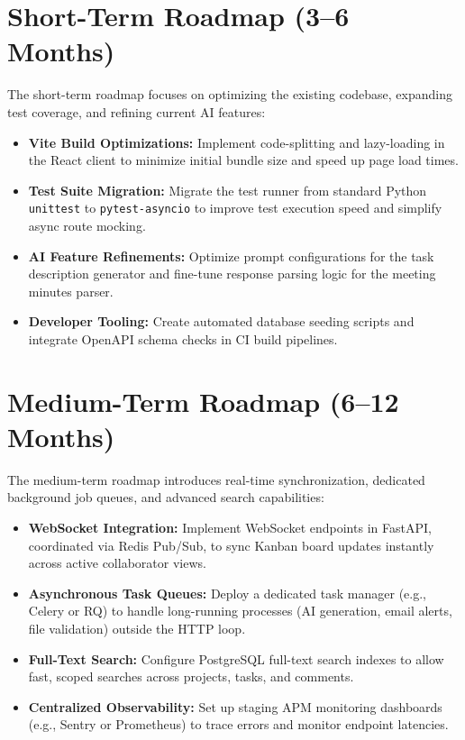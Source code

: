 \section{Short-Term Roadmap (3--6 Months)}
The short-term roadmap focuses on optimizing the existing codebase, expanding test coverage, and refining current AI features:
\begin{itemize}
    \item \textbf{Vite Build Optimizations:} Implement code-splitting and lazy-loading in the React client to minimize initial bundle size and speed up page load times.
    \item \textbf{Test Suite Migration:} Migrate the test runner from standard Python \texttt{unittest} to \texttt{pytest-asyncio} to improve test execution speed and simplify async route mocking.
    \item \textbf{AI Feature Refinements:} Optimize prompt configurations for the task description generator and fine-tune response parsing logic for the meeting minutes parser.
    \item \textbf{Developer Tooling:} Create automated database seeding scripts and integrate OpenAPI schema checks in CI build pipelines.
\end{itemize}

\section{Medium-Term Roadmap (6--12 Months)}
The medium-term roadmap introduces real-time synchronization, dedicated background job queues, and advanced search capabilities:
\begin{itemize}
    \item \textbf{WebSocket Integration:} Implement WebSocket endpoints in FastAPI, coordinated via Redis Pub/Sub, to sync Kanban board updates instantly across active collaborator views.
    \item \textbf{Asynchronous Task Queues:} Deploy a dedicated task manager (e.g., Celery or RQ) to handle long-running processes (AI generation, email alerts, file validation) outside the HTTP loop.
    \item \textbf{Full-Text Search:} Configure PostgreSQL full-text search indexes to allow fast, scoped searches across projects, tasks, and comments.
    \item \textbf{Centralized Observability:} Set up staging APM monitoring dashboards (e.g., Sentry or Prometheus) to trace errors and monitor endpoint latencies.
\end{itemize}

